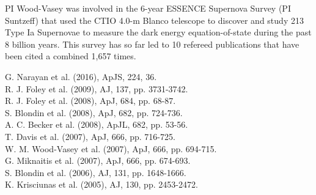 \documentclass[11pt]{article}
\begin{document}
PI Wood-Vasey was involved in the 6-year ESSENCE Supernova Survey (PI Suntzeff) that used the CTIO 4.0-m Blanco telescope to discover and study 213 Type Ia Supernovae to measure the dark energy equation-of-state during the past 8 billion years.  This survey has so far led to 10 refereed publications that have been cited a combined 1,657 times.

G. Narayan et al. (2016), ApJS, 224, 36.  \\  %
R. J. Foley et al. (2009), AJ, 137, pp. 3731-3742.  \\  %
R. J. Foley et al. (2008), ApJ, 684, pp. 68-87.  \\  %
S. Blondin et al. (2008), ApJ, 682, pp. 724-736.  \\  %
A. C. Becker et al. (2008), ApJL, 682, pp. 53-56. \\  %
T. Davis et al. (2007), ApJ, 666, pp. 716-725.  \\  %
W. M. Wood-Vasey et al. (2007), ApJ, 666, pp. 694-715. \\  %
G. Miknaitis et al. (2007), ApJ, 666, pp. 674-693. \\  %
S. Blondin et al. (2006), AJ, 131, pp. 1648-1666. \\  %
K. Krisciunas et al. (2005), AJ, 130, pp. 2453-2472. \\  %



%


\end{document}
